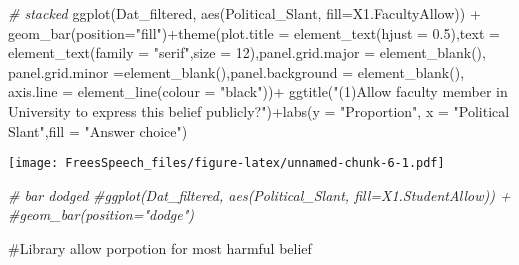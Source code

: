 \documentclass[
]{article}
\newenvironment{Shaded}{\begin{snugshade}}{\end{snugshade}}
\newcommand{\AttributeTok}[1]{\textcolor[rgb]{0.77,0.63,0.00}{#1}}
\newcommand{\CommentTok}[1]{\textcolor[rgb]{0.56,0.35,0.01}{\textit{#1}}}
\newcommand{\DecValTok}[1]{\textcolor[rgb]{0.00,0.00,0.81}{#1}}
\newcommand{\FloatTok}[1]{\textcolor[rgb]{0.00,0.00,0.81}{#1}}
\newcommand{\FunctionTok}[1]{\textcolor[rgb]{0.00,0.00,0.00}{#1}}
\newcommand{\NormalTok}[1]{#1}
\newcommand{\SpecialCharTok}[1]{\textcolor[rgb]{0.00,0.00,0.00}{#1}}
\newcommand{\StringTok}[1]{\textcolor[rgb]{0.31,0.60,0.02}{#1}}
\begin{document}
\begin{Shaded}
\begin{Highlighting}[]
\CommentTok{\# stacked}
\FunctionTok{ggplot}\NormalTok{(Dat\_filtered, }\FunctionTok{aes}\NormalTok{(Political\_Slant, }\AttributeTok{fill=}\NormalTok{X1.FacultyAllow)) }\SpecialCharTok{+} 
  \FunctionTok{geom\_bar}\NormalTok{(}\AttributeTok{position=}\StringTok{"fill"}\NormalTok{)}\SpecialCharTok{+}\FunctionTok{theme}\NormalTok{(}\AttributeTok{plot.title =} \FunctionTok{element\_text}\NormalTok{(}\AttributeTok{hjust =} \FloatTok{0.5}\NormalTok{),}\AttributeTok{text =} \FunctionTok{element\_text}\NormalTok{(}\AttributeTok{family =} \StringTok{"serif"}\NormalTok{,}\AttributeTok{size =} \DecValTok{12}\NormalTok{),}\AttributeTok{panel.grid.major =} \FunctionTok{element\_blank}\NormalTok{(), }\AttributeTok{panel.grid.minor =}\FunctionTok{element\_blank}\NormalTok{(),}\AttributeTok{panel.background =} \FunctionTok{element\_blank}\NormalTok{(), }\AttributeTok{axis.line =} \FunctionTok{element\_line}\NormalTok{(}\AttributeTok{colour =} \StringTok{"black"}\NormalTok{))}\SpecialCharTok{+}
\FunctionTok{ggtitle}\NormalTok{(}\StringTok{"(1)Allow faculty member in University to express this belief publicly?"}\NormalTok{)}\SpecialCharTok{+}\FunctionTok{labs}\NormalTok{(}\AttributeTok{y =} \StringTok{"Proportion"}\NormalTok{, }\AttributeTok{x =} \StringTok{"Political Slant"}\NormalTok{,}\AttributeTok{fill =} \StringTok{"Answer choice"}\NormalTok{)}
\end{Highlighting}
\end{Shaded}

\texttt{[image: FreesSpeech\_files/figure-latex/unnamed-chunk-6-1.pdf]}

\begin{Shaded}
\begin{Highlighting}[]
\CommentTok{\# bar dodged}
\CommentTok{\#ggplot(Dat\_filtered, aes(Political\_Slant, fill=X1.StudentAllow)) + }
  \CommentTok{\#geom\_bar(position="dodge")}
\end{Highlighting}
\end{Shaded}

\#Library allow porpotion for most harmful belief
\end{document}
